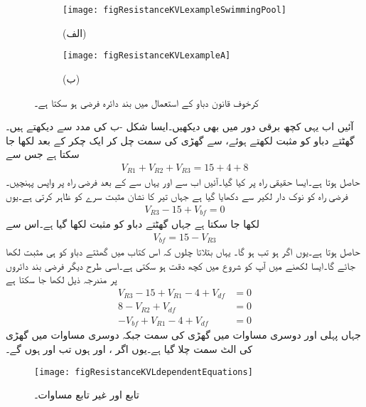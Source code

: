 \begin{figure}
\centering
\begin{subfigure}{0.5\textwidth}
\centering
\texttt{[image: figResistanceKVLexampleSwimmingPool]}
\caption*{(الف)}
\end{subfigure}%
%
\begin{subfigure}{0.5\textwidth}
\centering
\texttt{[image: figResistanceKVLexampleA]}
\caption*{(ب)}
\end{subfigure}%
\caption{کرخوف قانون دباو کے استعمال میں بند دائرہ فرضی ہو سکتا ہے۔}
\label{شکل_مزاحمتی_فرضی_بند_دائرہ}
\end{figure}

آئیں اب یہی کچھ برقی دور میں بھی دیکھیں۔ایسا شکل -ب کی مدد سے دیکھتے ہیں۔گھٹتے دباو کو مثبت لکھتے ہوئے،   سے  گھڑی کی سمت چل کر ایک چکر کے بعد  لکھا جا سکتا ہے جس سے
\begin{align*}
V_{R1}+V_{R2}+V_{R3}=15+4+8
\end{align*}
حاصل ہوتا ہے۔ایسا حقیقی راہ پر کیا گیا۔آئیں اب  سے  اور یہاں سے  کے بعد فرضی راہ پر واپس  پہنچیں۔فرضی راہ کو نوک دار لکیر سے دکھایا گیا ہے جہاں تیر کا نشان مثبت سرے کو ظاہر کرتی ہے۔یوں
\begin{align*}
V_{R3}-15+V_{bf}=0
\end{align*}
لکھا جا سکتا ہے جہاں گھٹتے دباو کو مثبت لکھا گیا ہے۔اس سے 
\begin{align*}
V_{bf}=15-V_{R3}
\end{align*}
حاصل ہوتا ہے۔یوں اگر  ہو تب  ہو گا۔ یہاں بتلاتا چلوں کہ اس کتاب میں گھٹتے دباو کو ہی مثبت لکھا جائے گا۔ایسا لکھنے میں آپ کو شروع میں کچھ دقت ہو سکتی ہے۔اسی طرح دیگر فرضی بند دائروں پر مندرجہ ذیل لکھا جا سکتا ہے
\begin{align*}
V_{R3}-15+V_{R1}-4+V_{df}&=0\\
8-V_{R2}+V_{df}&=0\\
-V_{bf}+V_{R1}-4+V_{df}&=0
\end{align*} 
جہاں پہلی اور دوسری مساوات میں گھڑی کی سمت جبکہ دوسری مساوات میں گھڑی کی الٹ سمت چلا گیا ہے۔یوں اگر ،  اور  ہوں تب  اور  ہوں گے۔

\begin{figure}
\centering
\texttt{[image: figResistanceKVLdependentEquations]}
\caption{تابع اور غیر تابع مساوات۔}
\label{شکل_مزاحمتی_تابع_مساوات}
\end{figure}

